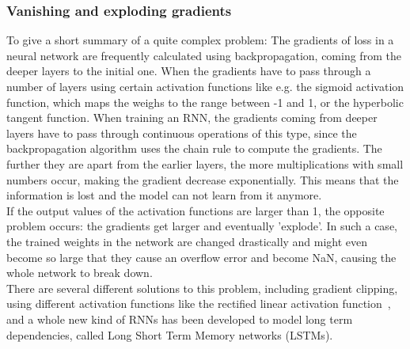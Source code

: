 \documentclass[
a4paper,
pagesize,
pdftex,
12pt,
twoside, %
BCOR=5mm, %
ngerman,
fleqn,
final,
]{scrartcl}
\begin{document}
	\subsubsection{Vanishing and exploding gradients}
	To give a short summary of a quite complex problem: The gradients of loss in a neural network are frequently calculated using backpropagation, coming from the deeper layers to the initial one. When the gradients have to pass through a number of layers using certain activation functions like e.g. the sigmoid activation function, which maps the weighs to the range between -1 and 1, or the hyperbolic tangent function. When training an RNN, the gradients coming from deeper layers have to pass through continuous operations of this type, since the backpropagation algorithm uses the chain rule to compute the gradients. The further they are apart from the earlier layers, the more multiplications with small numbers occur, making the gradient decrease exponentially. This means that the information is lost and the model can not learn from it anymore.\\
	If the output values of the activation functions are larger than 1, the opposite problem occurs: the gradients get larger and eventually 'explode'. In such a case, the trained weights in the network are changed drastically and might even become so large that they cause an overflow error and become NaN, causing the whole network to break down.\\
	There are several different solutions to this problem, including gradient clipping, using different activation functions like the rectified linear activation function~\cite{Glorot.2011}, and a whole new kind of RNNs has been developed to model long term dependencies, called Long Short Term Memory networks (LSTMs).
	
\end{document}
